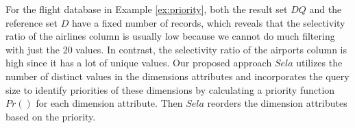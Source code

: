 %
For the flight database in Example \ref{ex:priority}, both the result set $DQ$ and the reference set $D$ have a fixed number of records, which reveals that the selectivity ratio of the airlines column is usually low because we cannot do much filtering with just the 20 values. 
%
In contrast, the selectivity ratio of the airports column is high since it has a lot of unique values.
%
Our proposed approach $Sela$ utilizes the number of distinct values in the dimensions attributes and incorporates the query size to identify priorities of these dimensions by calculating a %
priority function $Pr()$ for each dimension attribute. 
%
Then $Sela$ reorders the dimension attributes based on the priority. %

%

